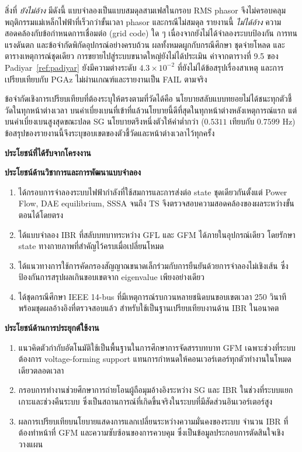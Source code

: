 \documentclass[12pt,a4paper]{article}
\newcommand{\templateheading}[1]{%
  \par\addvspace{0.85em}\noindent
  {\fontsize{19}{21}\selectfont\bfseries #1}\par
  \vspace{0.10em}\noindent{\color{academicblue}\rule{\textwidth}{0.9pt}}\par
  \vspace{0.30em}}
\newcommand{\templatesubheading}[1]{%
  \par\addvspace{0.55em}\noindent
  {\fontsize{17}{19}\selectfont\bfseries #1}\par\vspace{0.12em}}
\begin{document}
สิ่งที่ \emph{ยังไม่อ้าง} มีดังนี้ แบบจำลองเป็นแบบสมดุลสามเฟสในกรอบ RMS phasor จึงไม่ครอบคลุมพฤติกรรมแม่เหล็กไฟฟ้าที่เร็วกว่าขั้นเวลา phasor และกรณีไม่สมดุล รายงานนี้ \emph{ไม่ได้อ้าง} ความสอดคล้องกับข้อกำหนดการเชื่อมต่อ (grid code) ใด ๆ เนื่องจากยังไม่ได้จำลองระบบป้องกัน การทนแรงดันตก และข้อจำกัดพิกัดอุปกรณ์อย่างครบถ้วน ผลทั้งหมดผูกกับกรณีศึกษา ชุดจ่ายโหลด และตารางเหตุการณ์ชุดเดียว การขยายไปสู่ระบบขนาดใหญ่ยังไม่ได้ประเมิน ค่าจากตารางที่ 9.5 ของ Padiyar~\ref{ref:padiyar} ยังมีความต่างระดับ $4.3\times10^{-2}$ ที่ยังไม่ได้ข้อสรุปเรื่องสาเหตุ และการเปรียบเทียบกับ PGAz ไม่ผ่านเกณฑ์และรายงานเป็น FAIL ตามจริง

ข้อจำกัดเชิงการเปรียบเทียบที่ต้องระบุให้ตรงตามที่วัดได้คือ นโยบายสลับแบบทยอยไม่ได้ชนะทุกตัวชี้วัดในทุกหน้าต่างเวลา บนค่าเบี่ยงเบนที่เข้าที่แล้วนโยบายนี้ดีที่สุดในทุกหน้าต่างหลังเหตุการณ์แรก แต่บนค่าเบี่ยงเบนสูงสุดขณะปลด SG นโยบายตรึงหนึ่งตัวให้ค่าต่ำกว่า ($0.5311$ เทียบกับ $0.7599$ Hz) ข้อสรุปของรายงานนี้จึงระบุขอบเขตของตัวชี้วัดและหน้าต่างเวลาไว้ทุกครั้ง


\newpage
\templateheading{ประโยชน์ที่ได้รับจากโครงงาน}
\templatesubheading{ประโยชน์ด้านวิชาการและการพัฒนาแบบจำลอง}
\begin{enumerate}
\item ได้กรอบการจำลองระบบไฟฟ้ากำลังที่ใช้สมการและการส่งต่อ state ชุดเดียวกันตั้งแต่ Power Flow, DAE equilibrium, SSSA จนถึง TS จึงตรวจสอบความสอดคล้องของผลระหว่างขั้นตอนได้โดยตรง
\item ได้แบบจำลอง IBR ที่สลับบทบาทระหว่าง GFL และ GFM ได้ภายในอุปกรณ์เดียว โดยรักษา state ทางกายภาพที่สำคัญไว้ครบเมื่อเปลี่ยนโหมด
\item ได้แนวทางการใช้การคัดกรองสัญญาณขนาดเล็กร่วมกับการยืนยันด้วยการจำลองไม่เชิงเส้น ซึ่งป้องกันการสรุปผลเกินขอบเขตจาก eigenvalue เพียงอย่างเดียว
\item ได้ชุดกรณีศึกษา IEEE 14-bus ที่มีเหตุการณ์รบกวนหลายชนิดบนขอบเขตเวลา 250 วินาที พร้อมชุดผลอ้างอิงที่ตรวจสอบแล้ว สำหรับใช้เป็นฐานเปรียบเทียบงานด้าน IBR ในอนาคต
\end{enumerate}

\templatesubheading{ประโยชน์ด้านการประยุกต์ใช้งาน}
\begin{enumerate}
\item แนวคิดตัวกำกับอัตโนมัติใช้เป็นพื้นฐานในการศึกษาการจัดสรรบทบาท GFM เฉพาะช่วงที่ระบบต้องการ voltage-forming support แทนการกำหนดให้คอนเวอร์เตอร์ทุกตัวทำงานในโหมดเดียวตลอดเวลา
\item กรอบการทำงานช่วยศึกษาการถ่ายโอนผู้ถือมุมอ้างอิงระหว่าง SG และ IBR ในช่วงที่ระบบแยกเกาะและช่วงคืนระบบ ซึ่งเป็นสถานการณ์ที่เกิดขึ้นจริงในระบบที่มีสัดส่วนอินเวอร์เตอร์สูง
\item ผลการเปรียบเทียบนโยบายแสดงการแลกเปลี่ยนระหว่างความมั่นคงของระบบ จำนวน IBR ที่ต้องทำหน้าที่ GFM และความซับซ้อนของการควบคุม ซึ่งเป็นข้อมูลประกอบการตัดสินใจเชิงวางแผน
\end{enumerate}
\end{document}
